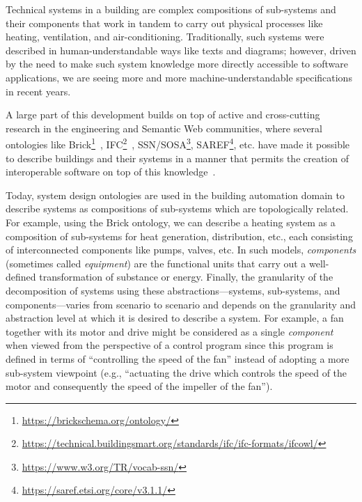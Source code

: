 \documentclass[sigconf]{acmart}
\begin{document}
Technical systems in a building are complex compositions of sub-systems and their components that work in tandem to carry out physical processes like heating, ventilation, and air-conditioning.
Traditionally, such systems were described in human-understandable ways like texts and diagrams; however, driven by the need to make such system knowledge more directly accessible to software applications, we are seeing more and more machine-understandable specifications in recent years.

A large part of this development builds on top of active and cross-cutting research in the engineering and Semantic Web communities, where several ontologies like Brick\footnote{\url{https://brickschema.org/ontology/}}~\cite{sd_balaji2016brick}, IFC\footnote{\url{https://technical.buildingsmart.org/standards/ifc/ifc-formats/ifcowl/}}~\cite{sd_ifc_beetz2009ifcowl}, SSN/SOSA\footnote{\url{https://www.w3.org/TR/vocab-ssn/}}, SAREF\footnote{\url{https://saref.etsi.org/core/v3.1.1/}}, etc. have made it possible to describe buildings and their systems in a manner that permits the creation of interoperable software on top of this knowledge~\cite{mayer2017open}.

Today, system design ontologies are used in the building automation domain to describe systems as compositions of sub-systems which are topologically related.
For example, using the Brick ontology, we can describe a heating system as a composition of sub-systems for heat generation, distribution, etc., each consisting of interconnected components like pumps, valves, etc.
In such models, \textit{components} (sometimes called \textit{equipment}) are the functional units that carry out a well-defined transformation of substance or energy.
Finally, the granularity of the decomposition of systems using these abstractions---systems, sub-systems, and components---varies from scenario to scenario and depends on the granularity and abstraction level at which it is desired to describe a system.
For example, a fan together with its motor and drive might be considered as a single \emph{component} when viewed from the perspective of a control program since this program is defined in terms of ``controlling the speed of the fan'' instead of adopting a more sub-system viewpoint (e.g., ``actuating the drive which controls the speed of the motor and consequently the speed of the impeller of the fan'').
\end{document}
